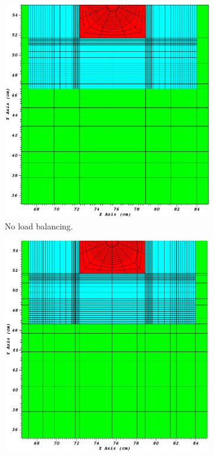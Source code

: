 \documentclass[times,final]{elsarticle}
\begin{document}
\begin{figure}[ht]
\centering
\begin{subfigure}[t]{\textwidth}
\centering
\includegraphics[scale=0.3]{../figures/level2_7_reg_zoom.png}
\caption{No load balancing.}
\label{7_regular}
\end{subfigure}
\begin{subfigure}[b]{\textwidth}
\centering
\includegraphics[scale=0.3]{../figures/level2_7_lb_zoom.png}

\end{subfigure}
\end{figure}
\end{document}
